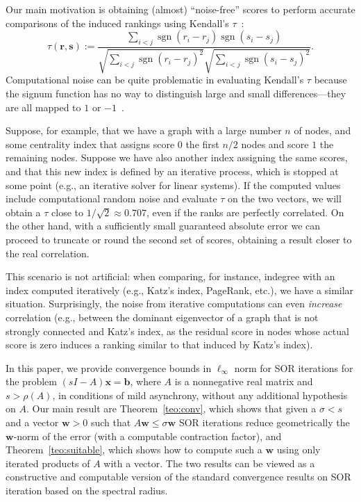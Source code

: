 \documentclass{article}
\newcommand{\signum}{\operatorname{sgn}}
\newcommand{\w}{{\bm w}}
\newcommand{\1}{\mathbf 1}
\begin{document}
Our main motivation is obtaining (almost) ``noise-free'' scores to perform
accurate comparisons of the induced rankings using Kendall's $\tau$~\cite{KenTTRP}:
\[\tau(\bm r, \bm s)
:=\frac{\sum_{i<j}\signum(r_i-r_j)\signum(s_i-s_j)}{\sqrt{\sum_{i<j}\signum(r_i-r_j)^2}
\sqrt{\sum_{i<j}\signum(s_i-s_j)^2}}. \] 
Computational noise can be quite problematic in evaluating Kendall's $\tau$ because
the signum function has no way to distinguish large and small differences---they are all mapped to $1$ or $-1$~\cite{BPSTPTP}.

Suppose, for example, that we have a
graph with a large number $n$ of nodes, and some centrality index that assigns score $0$ the first
$n/2$ nodes and score $1$ the remaining nodes. Suppose we have also another
index assigning the same scores, and that this new index is defined
by an iterative process, which is stopped at some point (e.g., an iterative
solver for linear systems). If the computed values
include computational random noise and evaluate $\tau$ on the two
vectors, we will obtain a $\tau$ close to $1/\sqrt2\approx 0.707$, even if the ranks are
perfectly correlated. On the other hand, with a sufficiently small guaranteed
absolute error we can proceed to truncate or round the second set of scores, obtaining
a result closer to the real correlation.

This scenario is not artificial: when comparing, for instance, indegree
with an index computed iteratively (e.g., Katz's index, PageRank, etc.), we have
a similar situation. Surprisingly, the noise from iterative computations can
even \emph{increase} correlation (e.g., between the dominant eigenvector of a graph
that is not strongly connected and Katz's index, as the residual score in nodes
whose actual score is zero induces a ranking similar to that induced by
Katz's index).

In this paper, we provide convergence bounds in $\ell_\infty$ norm for SOR iterations for
the problem $(s  I-A)\bm x = \bm b$, where $A$ is a nonnegative real matrix
and $s  > \rho(A)$, in conditions of mild asynchrony, without any
additional hypothesis on $A$. Our main result are Theorem~\ref{teo:conv}, which shows 
that given a $\sigma <s$ and a vector $\w>0$ such that $A\w\leq\sigma\w$
SOR iterations reduce geometrically the $\w$-norm of the error (with a
computable contraction factor), and Theorem~\ref{teo:suitable}, which shows how
to compute such a $\w$ using only iterated products of $A$ with a vector. The
two results can be viewed as a constructive and computable version of the 
standard convergence results on SOR iteration based on the spectral radius.
\end{document}
